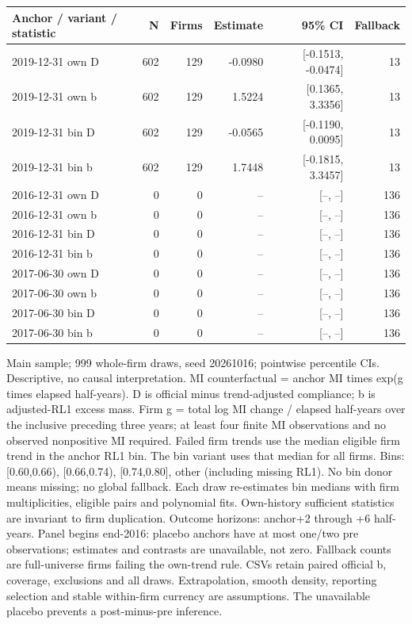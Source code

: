 \begingroup\scriptsize\setlength{\tabcolsep}{3pt}
\begin{threeparttable}
\begin{tabular}{lrrrrr}
\toprule
Anchor / variant / statistic & N & Firms & Estimate & 95\% CI & Fallback \\
\midrule
2019-12-31 own D & 602 & 129 & -0.0980 & [-0.1513, -0.0474] & 13 \\
2019-12-31 own b & 602 & 129 & 1.5224 & [0.1365, 3.3356] & 13 \\
2019-12-31 bin D & 602 & 129 & -0.0565 & [-0.1190, 0.0095] & 13 \\
2019-12-31 bin b & 602 & 129 & 1.7448 & [-0.1815, 3.3457] & 13 \\
2016-12-31 own D & 0 & 0 & -- & [--, --] & 136 \\
2016-12-31 own b & 0 & 0 & -- & [--, --] & 136 \\
2016-12-31 bin D & 0 & 0 & -- & [--, --] & 136 \\
2016-12-31 bin b & 0 & 0 & -- & [--, --] & 136 \\
2017-06-30 own D & 0 & 0 & -- & [--, --] & 136 \\
2017-06-30 own b & 0 & 0 & -- & [--, --] & 136 \\
2017-06-30 bin D & 0 & 0 & -- & [--, --] & 136 \\
2017-06-30 bin b & 0 & 0 & -- & [--, --] & 136 \\
\bottomrule
\end{tabular}
\begin{tablenotes}[flushleft]\footnotesize
\item[] Main sample; 999 whole-firm draws, seed 20261016; pointwise percentile CIs. Descriptive, no causal interpretation. MI counterfactual = anchor MI times exp(g times elapsed half-years). D is official minus trend-adjusted compliance; b is adjusted-RL1 excess mass. Firm g = total log MI change / elapsed half-years over the inclusive preceding three years; at least four finite MI observations and no observed nonpositive MI required. Failed firm trends use the median eligible firm trend in the anchor RL1 bin. The bin variant uses that median for all firms. Bins: [0.60,0.66), [0.66,0.74), [0.74,0.80], other (including missing RL1). No bin donor means missing; no global fallback. Each draw re-estimates bin medians with firm multiplicities, eligible pairs and polynomial fits. Own-history sufficient statistics are invariant to firm duplication. Outcome horizons: anchor+2 through +6 half-years. Panel begins end-2016: placebo anchors have at most one/two pre observations; estimates and contrasts are unavailable, not zero. Fallback counts are full-universe firms failing the own-trend rule. CSVs retain paired official b, coverage, exclusions and all draws. Extrapolation, smooth density, reporting selection and stable within-firm currency are assumptions. The unavailable placebo prevents a post-minus-pre inference.
\end{tablenotes}
\end{threeparttable}
